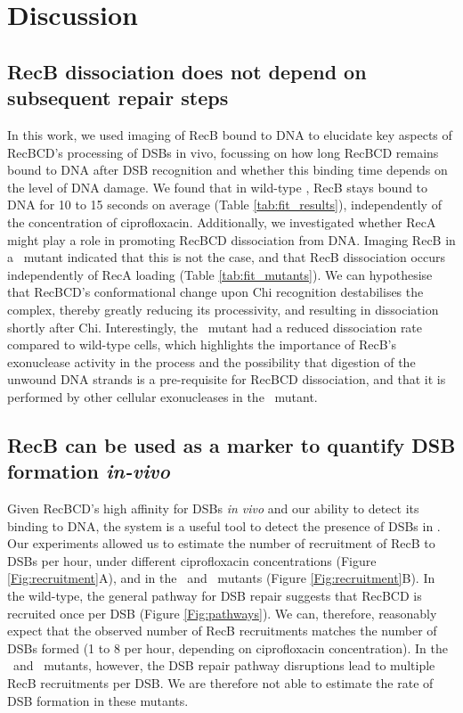 \section*{Discussion}

\subsection*{RecB dissociation does not depend on subsequent repair steps}
In this work, we used imaging of RecB bound to DNA to elucidate key aspects of RecBCD's processing of DSBs in vivo, focussing on how long RecBCD remains bound to DNA after DSB recognition and whether this binding time depends on the level of DNA damage. We found that in wild-type \ecoli, RecB stays bound to DNA for 10 to 15 seconds on average (Table \ref{tab:fit_results}), independently of the concentration of ciprofloxacin. Additionally, we investigated whether RecA might play a role in promoting RecBCD dissociation from DNA. Imaging RecB in a \dreca\ mutant indicated that this is not the case, and that RecB dissociation occurs independently of RecA loading (Table \ref{tab:fit_mutants}). We can hypothesise that RecBCD's conformational change upon Chi recognition destabilises the complex, thereby greatly reducing its processivity, and resulting in dissociation shortly after Chi. Interestingly, the \geneteneighty\ mutant had a reduced dissociation rate compared to wild-type cells, which highlights the importance of RecB's exonuclease activity in the process and the possibility that digestion of the unwound DNA strands is a pre-requisite for RecBCD dissociation, and that it is performed by other cellular exonucleases in the \geneteneighty\ mutant.

\subsection*{RecB can be used as a marker to quantify DSB formation \emph{in-vivo}}
Given RecBCD's high affinity for DSBs \emph{in vivo} and our ability to detect its binding to DNA, the system is a useful tool to detect the presence of DSBs in \ecoli. Our experiments allowed us to estimate the number of recruitment of RecB to DSBs per hour, under different ciprofloxacin concentrations (Figure \ref{Fig:recruitment}A), and in the \dreca\ and \geneteneighty\ mutants (Figure \ref{Fig:recruitment}B). In the wild-type, the general pathway for DSB repair suggests that RecBCD is recruited once per DSB (Figure \ref{Fig:pathways}). We can, therefore, reasonably expect that the observed number of RecB recruitments matches the number of DSBs formed (1 to 8 per hour, depending on ciprofloxacin concentration). In the \dreca\ and \geneteneighty\ mutants, however, the DSB repair pathway disruptions lead to multiple RecB recruitments per DSB. We are therefore not able to estimate the rate of DSB formation in these mutants.


